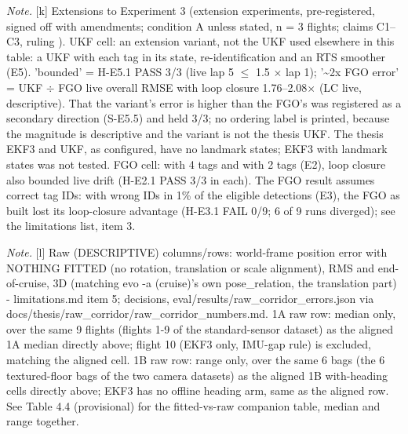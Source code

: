 \begin{table}[htbp]
\textit{Note.} [k] Extensions to Experiment 3 (extension experiments, pre-registered, signed off with amendments; condition A unless stated, n = 3 flights; claims C1--C3, ruling ). UKF cell: an extension variant, not the UKF used elsewhere in this table: a UKF with each tag in its state, re-identification and an RTS smoother (E5). 'bounded' = H-E5.1 PASS 3/3 (live lap 5 $\le$ 1.5 $\times$ lap 1); '\textasciitilde{}2x FGO error' = UKF $\div$ FGO live overall RMSE with loop closure 1.76--2.08$\times$ (LC live, descriptive). That the variant's error is higher than the FGO's was registered as a secondary direction (S-E5.5) and held 3/3; no ordering label is printed, because the magnitude is descriptive and the variant is not the thesis UKF. The thesis EKF3 and UKF, as configured, have no landmark states; EKF3 with landmark states was not tested. FGO cell: with 4 tags and with 2 tags (E2), loop closure also bounded live drift (H-E2.1 PASS 3/3 in each). The FGO result assumes correct tag IDs: with wrong IDs in 1\% of the eligible detections (E3), the FGO as built lost its loop-closure advantage (H-E3.1 FAIL 0/9; 6 of 9 runs diverged); see the limitations list, item 3.\par
\textit{Note.} [l] Raw (DESCRIPTIVE) columns/rows: world-frame position error with NOTHING FITTED (no rotation, translation or scale alignment), RMS and end-of-cruise, 3D (matching evo -a (cruise)'s own pose\_relation, the translation part) - limitations.md item 5; decisions, eval/results/raw\_corridor\_errors.json via docs/thesis/raw\_corridor/raw\_corridor\_numbers.md. 1A raw row: median only, over the same 9 flights (flights 1-9 of the standard-sensor dataset) as the aligned 1A median directly above; flight 10 (EKF3 only, IMU-gap rule) is excluded, matching the aligned cell. 1B raw row: range only, over the same 6 bags (the 6 textured-floor bags of the two camera datasets) as the aligned 1B with-heading cells directly above; EKF3 has no offline heading arm, same as the aligned row. See Table 4.4 (provisional) for the fitted-vs-raw companion table, median and range together.\par
\end{table}
